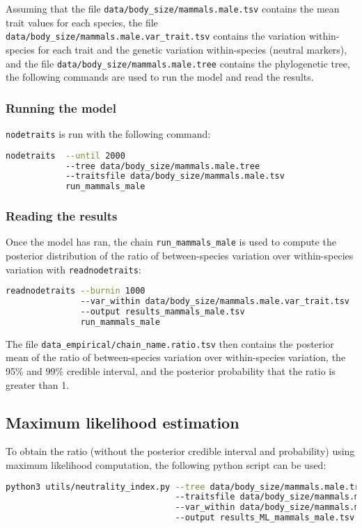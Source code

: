 \documentclass{article}
\begin{document}
Assuming that the file \texttt{data/body\_size/mammals.male.tsv} contains the mean trait values for each species, the file \texttt{data/body\_size/mammals.male.var\_trait.tsv} contains the variation within-species for each trait and the genetic variation within-species (neutral markers), and the file \texttt{data/body\_size/mammals.male.tree} contains the phylogenetic tree, the following commands are used to run the model and read the results.

\subsubsection{Running the model}\label{subsubsec:running-nodetraits}
\texttt{nodetraits} is run with the following command:
\begin{lstlisting}[language = sh,label={lst:nodetraits-run}]
nodetraits  --until 2000
            --tree data/body_size/mammals.male.tree
            --traitsfile data/body_size/mammals.male.tsv
            run_mammals_male
\end{lstlisting}

\subsubsection{Reading the results}\label{subsubsec:reading-the-results}
Once the model has ran, the chain \texttt{run\_mammals\_male} is used to compute the posterior distribution of the ratio of between-species variation over within-species variation with \texttt{readnodetraits}:
\begin{lstlisting}[language = sh,label={lst:readnodetraits-rho}]
readnodetraits --burnin 1000
               --var_within data/body_size/mammals.male.var_trait.tsv
               --output results_mammals_male.tsv
               run_mammals_male
\end{lstlisting}
The file \texttt{data\_empirical/chain\_name.ratio.tsv} then contains the posterior mean of the ratio of between-species variation over within-species variation, the 95\% and 99\% credible interval, and the posterior probability that the ratio is greater than 1.

\subsection{Maximum likelihood estimation}\label{subsec:maximum-likelihood-estimation}

To obtain the ratio (without the posterior credible interval and probability) using maximum likelihood computation, the following python script can be used:
\begin{lstlisting}[language = sh, label={lst:neutrality_index}]
python3 utils/neutrality_index.py --tree data/body_size/mammals.male.tree
                                  --traitsfile data/body_size/mammals.male.tsv
                                  --var_within data/body_size/mammals.male.var_trait.tsv
                                  --output results_ML_mammals_male.tsv
\end{lstlisting}
\end{document}
